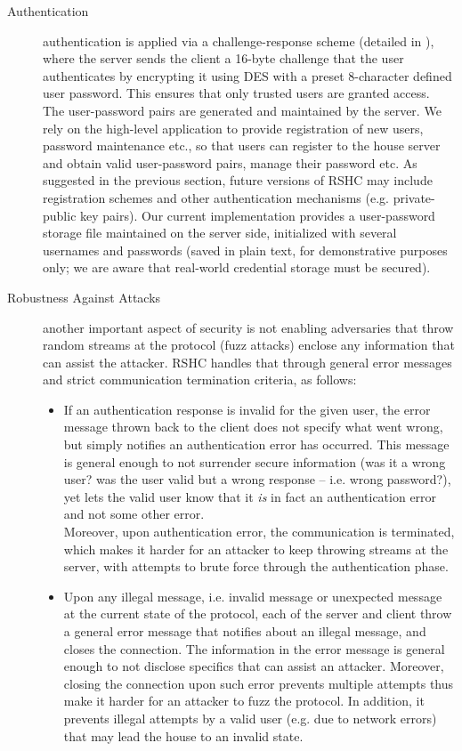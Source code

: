 \begin{description}
\item[Authentication] authentication is applied via a challenge-response scheme (detailed in ), where the server sends the client a 16-byte challenge that the user authenticates by encrypting it using DES with a preset 8-character defined user password. This ensures that only trusted users are granted access.\\
    The user-password pairs are generated and maintained by the server. We rely on the high-level application to provide registration of new users, password maintenance etc., so that users can register to the house server and obtain valid user-password pairs, manage their password etc. As suggested in the previous section, future versions of RSHC may include registration schemes and other authentication mechanisms (e.g. private-public key pairs). Our current implementation provides a user-password storage file maintained on the server side, initialized with several usernames and passwords (saved in plain text, for demonstrative purposes only; we are aware that real-world credential storage must be secured).\\
\item[Robustness Against Attacks] another important aspect of security is not enabling adversaries that throw random streams at the protocol (fuzz attacks) enclose any information that can assist the attacker. RSHC handles that through general error messages and strict communication termination criteria, as follows:
    \begin{itemize}
    \item If an authentication response is invalid for the given user, the error message thrown back to the client does not specify what went wrong, but simply notifies an authentication error has occurred. This message is general enough to not surrender secure information (was it a wrong user? was the user valid but a wrong response -- i.e. wrong password?), yet lets the valid user know that it {\em is} in fact an authentication error and not some other error.\\
        Moreover, upon authentication error, the communication is terminated, which makes it harder for an attacker to keep throwing streams at the server, with attempts to brute force through the authentication phase.
    \item Upon any illegal message, i.e. invalid message or unexpected message at the current state of the protocol, each of the server and client throw a general error message that notifies about an illegal message, and closes the connection. The information in the error message is general enough to not disclose specifics that can assist an attacker. Moreover, closing the connection upon such error prevents multiple attempts thus make it harder for an attacker to fuzz the protocol. In addition, it prevents illegal attempts by a valid user (e.g. due to network errors) that may lead the house to an invalid state.
    \end{itemize} 
\end{description}

